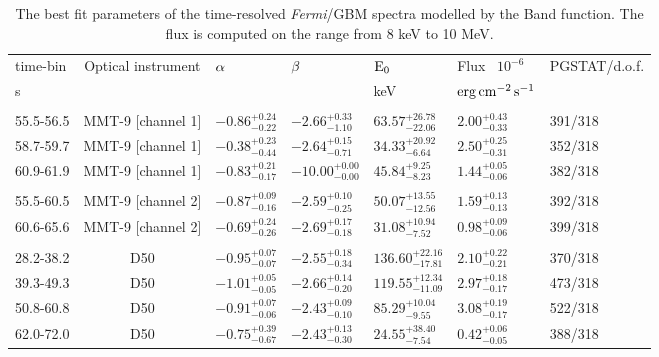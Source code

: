 \documentclass{naturesubmissionstyle}
\begin{document}
\begin{table}
\centering
\begin{tabular}{lclllll}
time-bin	&  Optical instrument 	& $\rm \alpha$ & $\rm \beta$ & $\rm E_{0}$ & Flux \, $10^{-6}$ 	& PGSTAT/d.o.f.\\
s	&	&   & 	& keV	&   $\rm erg \, cm^{-2} \,  s^{-1}$ &	\\
\hline	
\\
55.5-56.5 & MMT-9 [channel 1] & $-0.86_{-0.22}^{+0.24}$ & $-2.66_{-1.10}^{+0.33}$ & $63.57_{-22.06}^{+26.78}$ & $2.00_{-0.33}^{+0.43}$ & 391/318 \\ 
58.7-59.7 & MMT-9 [channel 1] & $-0.38_{-0.44}^{+0.23}$ & $-2.64_{-0.71}^{+0.15}$ & $34.33_{-6.64}^{+20.92}$ & $2.50_{-0.31}^{+0.25}$ & 352/318 \\ 
60.9-61.9 & MMT-9 [channel 1] & $-0.83_{-0.17}^{+0.21}$ & $-10.00_{-0.00}^{+0.00}$ & $45.84_{-8.23}^{+9.25}$ & $1.44_{-0.06}^{+0.05}$ & 382/318 \\ 


\hline
\\
55.5-60.5 & MMT-9 [channel 2] & $-0.87_{-0.16}^{+0.09}$ & $-2.59_{-0.25}^{+0.10}$ & $50.07_{-12.56}^{+13.55}$ & $1.59_{-0.13}^{+0.13}$ & 392/318 \\ 
60.6-65.6 & MMT-9 [channel 2] & $-0.69_{-0.26}^{+0.24}$ & $-2.69_{-0.18}^{+0.17}$ & $31.08_{-7.52}^{+10.94}$ & $0.98_{-0.06}^{+0.09}$ & 399/318 \\   
\hline
\\
28.2-38.2 & D50 & $-0.95_{-0.07}^{+0.07}$ & $-2.55_{-0.34}^{+0.18}$ & $136.60_{-17.81}^{+22.16}$ & $2.10_{-0.21}^{+0.22}$ & 370/318 \\ 
39.3-49.3 & D50 & $-1.01_{-0.05}^{+0.05}$ & $-2.66_{-0.20}^{+0.14}$ & $119.55_{-11.09}^{+12.34}$ & $2.97_{-0.17}^{+0.18}$ & 473/318 \\ 
50.8-60.8 & D50 & $-0.91_{-0.06}^{+0.07}$ & $-2.43_{-0.10}^{+0.09}$ & $85.29_{-9.55}^{+10.04}$ & $3.08_{-0.17}^{+0.19}$ & 522/318 \\ 
62.0-72.0 & D50 & $-0.75_{-0.67}^{+0.39}$ & $-2.43_{-0.30}^{+0.13}$ & $24.55_{-7.54}^{+38.40}$ & $0.42_{-0.05}^{+0.06}$ & 388/318 \\ 

\hline	

\end{tabular}
\caption{The best fit parameters of the time-resolved \textit{Fermi}/GBM spectra modelled by the Band function. The flux is computed on the range from 8 keV to 10 MeV. }
\label{fermi_tab}
\end{table}
\end{document}
